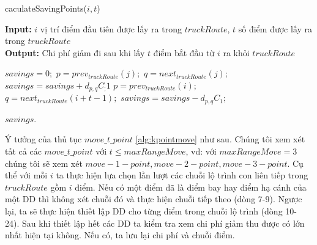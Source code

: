 \documentclass[a4paper,12pt]{report}
\begin{document}
\begin{algorithm}[H]

\caption{caculateSavingPoints($i,t$)}
\textbf{Input:} $i$ vị trí điểm đầu tiên được lấy ra trong $truckRoute$, $t$ số điểm được lấy ra trong $truckRoute$\\
\textbf{Output:} Chi phí giảm đi sau khi lấy $t$ điểm bắt đầu từ $i$ ra khỏi $truckRoute$

\begin{algorithmic}[1]
\State $savings=0;$
\State $p=prev_{truckRoute}(j);$
\State $q=next_{truckRoute}(j);$
\State $savings=savings+ d_{p,q}C_;1$
\EndFor
\State $p=prev_{truckRoute}(i);$
\State $q=next_{truckRoute}(i+t-1);$
\State $savings=savings- d_{p,q}C_1;$

\Return $savings$.
\end{algorithmic}
\label{alg:caculateSavingPoints}
\end{algorithm}
Ý tưởng của thủ tục $move\_t\_point$ \ref{alg:kpointmove} như sau. Chúng tôi xem xét tất cả các $move\_t\_point$ với $t \leq maxRangeMove$, vd: với $maxRangeMove=3$ chúng tôi sẽ xem xét $move-1-point,move-2-point,move-3-point$. 
Cụ thể với mỗi $i$ ta thực hiện lựa chọn lần lượt các chuỗi lộ trình con liên tiếp trong $truckRoute$ gồm $i$ điểm. Nếu có một điểm đã là điểm bay hay điểm hạ cánh của một \ac{DD} thì không xét chuỗi đó và thực hiện chuỗi tiếp theo (dòng 7-9). Ngược lại, ta sẽ thực hiện thiết lập \ac{DD} cho từng điểm trong chuỗi lộ trình (dòng 10- 24). Sau khi thiết lập hết các \ac{DD} ta kiểm tra xem chi phí giảm thu được có lớn nhất hiện tại không. Nếu có, ta lưu lại chi phí và chuỗi điểm. \\
\end{document}
